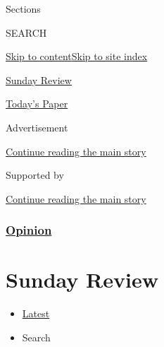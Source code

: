 Sections

SEARCH

\protect\hyperlink{site-content}{Skip to
content}\protect\hyperlink{site-index}{Skip to site index}

\href{https://www.nytimes.com/section/opinion/sunday}{Sunday Review}

\href{https://myaccount.nytimes.com/auth/login?response_type=cookie\&client_id=vi}{}

\href{https://www.nytimes.com/section/todayspaper}{Today's Paper}

Advertisement

\protect\hyperlink{after-top}{Continue reading the main story}

Supported by

\protect\hyperlink{after-sponsor}{Continue reading the main story}

\hypertarget{opinion}{%
\subsubsection{\texorpdfstring{\href{/section/opinion}{Opinion}}{Opinion}}\label{opinion}}

\hypertarget{sunday-review}{%
\section{Sunday Review}\label{sunday-review}}

\begin{itemize}
\tightlist
\item
  \protect\hyperlink{stream-panel}{Latest}
\item
  Search
\end{itemize}

